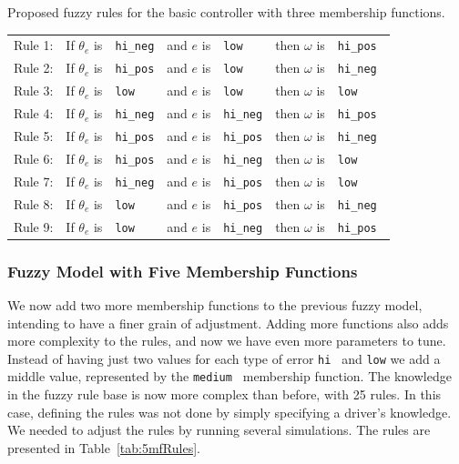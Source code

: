 \documentclass[symmetry,article,submit,moreauthors,pdftex]{Definitions/mdpi}
\begin{document}
\begin{specialtable}[H]
    \caption{Proposed fuzzy rules for the basic controller with three membership functions.}\label{tab:3mf}
    \centering
    \begin{tabular}{lllllll}
    Rule 1: & If $\theta_e$ is & { \tt hi\_neg} & and $e$ is & {\tt low}     & then $\omega$  is & {\tt hi\_pos}     \\
    Rule 2: & If $\theta_e$ is  & { \tt hi\_pos} & and $e$ is & {\tt low}     & then $\omega$ is & {\tt hi\_neg }    \\
    Rule 3: & If $\theta_e$ is & { \tt  low }     & and $e$ is & {\tt low}     & then $\omega$ is &{\tt low}         \\
    Rule 4: & If $\theta_e$ is & { \tt hi\_neg} & and $e$ is & {\tt hi\_neg} & then $\omega$ is &{\tt hi\_pos}     \\
    Rule 5: & If $\theta_e$ is & { \tt hi\_pos} & and $e$ is & {\tt hi\_pos} & then $\omega$ is &{\tt hi\_neg }    \\
    Rule 6: & If $\theta_e$ is & { \tt hi\_pos} & and $e$ is & {\tt hi\_neg} & then $\omega$ is &{\tt low   }      \\
    Rule 7: & If $\theta_e$ is & { \tt hi\_neg} & and $e$ is & {\tt hi\_pos} & then $\omega$ is & {\tt low   }      \\
    Rule 8: & If $\theta_e$ is & { \tt low }    & and $e$ is & {\tt hi\_pos} & then $\omega$ is & {\tt hi\_neg }    \\
    Rule 9: & If $\theta_e$ is & { \tt low}     & and $e$ is & {\tt hi\_neg} & then $\omega$ is & {\tt hi\_pos }
    \end{tabular}
 \end{specialtable}


\subsubsection{Fuzzy Model with Five Membership Functions}

We now add two more membership functions to the previous fuzzy model, intending
to have a finer grain of adjustment. Adding more functions also adds more
complexity to the rules, and now we have even more parameters to tune.  Instead
of having just two values for each type of error { \tt hi } and {\tt low} we
add a middle value, represented by the { \tt medium } membership function. The
knowledge in the fuzzy rule base is now more complex than before, with 25
rules. In this case, defining the rules was not done by simply specifying a
driver's knowledge. We needed to adjust the rules by running several
simulations. The rules are presented in Table~\ref{tab:5mfRules}.
\end{document}
